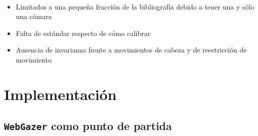 \documentclass[aspectratio=169]{beamer}
\begin{document}
\begin{frame}{~}
  \begin{itemize}
    \item Limitados a una pequeña fracción de la bibliografía debido a tener
      una y sólo una cámara
    
    \item Falta de estándar respecto de cómo calibrar

    \item Ausencia de invarianza frente a movimientos de cabeza y de
      reestricción de movimiento
  \end{itemize}
\end{frame}

\section{Implementación}

\subsection{\texttt{WebGazer} como punto de partida}
\end{document}

